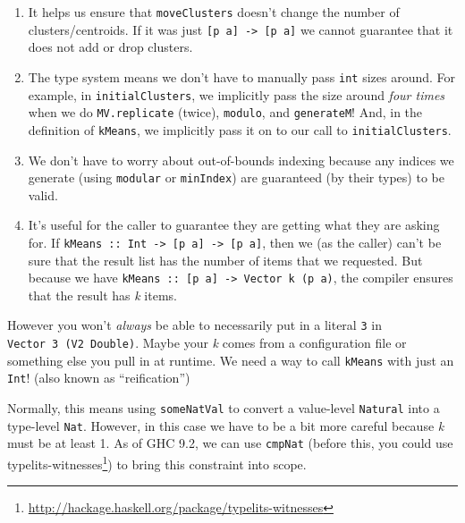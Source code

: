 \documentclass[]{article}
\renewcommand{\href}[2]{#2\footnote{\url{#1}}}
\begin{document}
\begin{enumerate}
\def\labelenumi{\arabic{enumi}.}
\tightlist
\item
  It helps us ensure that \texttt{moveClusters} doesn't change the number of
  clusters/centroids. If it was just
  \texttt{{[}p\ a{]}\ -\textgreater{}\ {[}p\ a{]}} we cannot guarantee that it
  does not add or drop clusters.
\item
  The type system means we don't have to manually pass \texttt{int} sizes
  around. For example, in \texttt{initialClusters}, we implicitly pass the size
  around \emph{four times} when we do \texttt{MV.replicate} (twice),
  \texttt{modulo}, and \texttt{generateM}! And, in the definition of
  \texttt{kMeans}, we implicitly pass it on to our call to
  \texttt{initialClusters}.
\item
  We don't have to worry about out-of-bounds indexing because any indices we
  generate (using \texttt{modular} or \texttt{minIndex}) are guaranteed (by
  their types) to be valid.
\item
  It's useful for the caller to guarantee they are getting what they are asking
  for. If
  \texttt{kMeans\ ::\ Int\ -\textgreater{}\ {[}p\ a{]}\ -\textgreater{}\ {[}p\ a{]}},
  then we (as the caller) can't be sure that the result list has the number of
  items that we requested. But because we have
  \texttt{kMeans\ ::\ {[}p\ a{]}\ -\textgreater{}\ Vector\ k\ (p\ a)}, the
  compiler ensures that the result has \emph{k} items.
\end{enumerate}

However you won't \emph{always} be able to necessarily put in a literal
\texttt{3} in \texttt{Vector\ 3\ (V2\ Double)}. Maybe your \emph{k} comes from a
configuration file or something else you pull in at runtime. We need a way to
call \texttt{kMeans} with just an \texttt{Int}! (also known as ``reification'')

Normally, this means using \texttt{someNatVal} to convert a value-level
\texttt{Natural} into a type-level \texttt{Nat}. However, in this case we have
to be a bit more careful because \emph{k} must be at least 1. As of GHC 9.2, we
can use \texttt{cmpNat} (before this, you could use
\href{http://hackage.haskell.org/package/typelits-witnesses}{typelits-witnesses})
to bring this constraint into scope.
\end{document}
